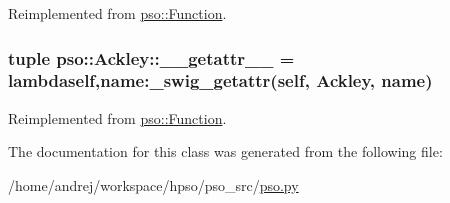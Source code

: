 Reimplemented from \hyperlink{classpso_1_1Function_5bddc07dbaab0ee579488bdcc8103a71}{pso::Function}.\hypertarget{classpso_1_1Ackley_fe69fdc3d753f4c792ee79366560737c}{
\subsubsection{\setlength{\rightskip}{0pt plus 5cm}tuple {\bf pso::Ackley::\_\-\_\-getattr\_\-\_\-} = lambdaself,name:\_\-swig\_\-getattr(self, {\bf Ackley}, name)}}
\label{classpso_1_1Ackley_fe69fdc3d753f4c792ee79366560737c}




Reimplemented from \hyperlink{classpso_1_1Function_affeed856b337656e88895fa35321496}{pso::Function}.

The documentation for this class was generated from the following file:\begin{CompactItemize}
\item 
/home/andrej/workspace/hpso/pso\_\-src/\hyperlink{pso_8py}{pso.py}\end{CompactItemize}
